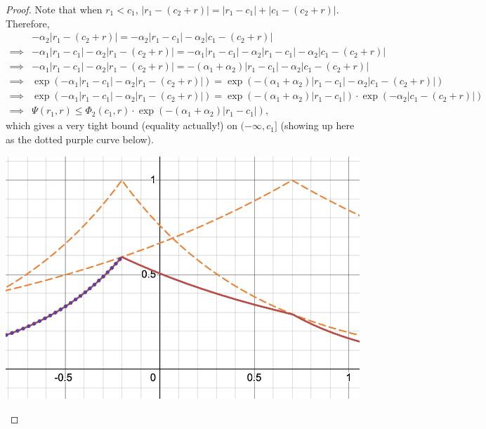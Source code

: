 \documentclass[12pt]{article}
\begin{document}
\begin{proof}
Note that when \(r_1 < c_1\), \(|r_1 - (c_2+r)| = |r_1 - c_1| + |c_1 - (c_2+r)|\).
Therefore,
\begin{align*}
    &-\alpha_2|r_1 - (c_2+r)| = -\alpha_2|r_1 - c_1| -\alpha_2|c_1 - (c_2+r)|\\
    \implies & -\alpha_1|r_1-c_1|-\alpha_2|r_1 - (c_2+r)|= -\alpha_1|r_1-c_1|-\alpha_2|r_1 - c_1| -\alpha_2|c_1 - (c_2+r)|\\
    \implies & -\alpha_1|r_1-c_1|-\alpha_2|r_1 - (c_2+r)|= -(\alpha_1 + \alpha_2)|r_1 - c_1| -\alpha_2|c_1 - (c_2+r)|\\
    \implies & \exp(-\alpha_1|r_1-c_1|-\alpha_2|r_1 - (c_2+r)|) = \exp(-(\alpha_1 + \alpha_2)|r_1 - c_1| -\alpha_2|c_1 - (c_2+r)|)\\
    \implies &\exp(-\alpha_1|r_1-c_1|-\alpha_2|r_1 - (c_2+r)|) = \exp(-(\alpha_1 + \alpha_2)|r_1 - c_1|)\cdot \exp(-\alpha_2|c_1 - (c_2+r)|)\\
    \implies & \Psi(r_1,r) \leq \Phi_2(c_1,r) \cdot \exp(-(\alpha_1 + \alpha_2)|r_1 - c_1|),
\end{align*}
which gives a very tight bound (equality actually!) on \((-\infty, c_1]\) (showing up here as the dotted purple curve below).

\begin{center}
    \includegraphics[scale=0.5]{figure3.png}
\end{center}


\end{proof}
\end{document}
